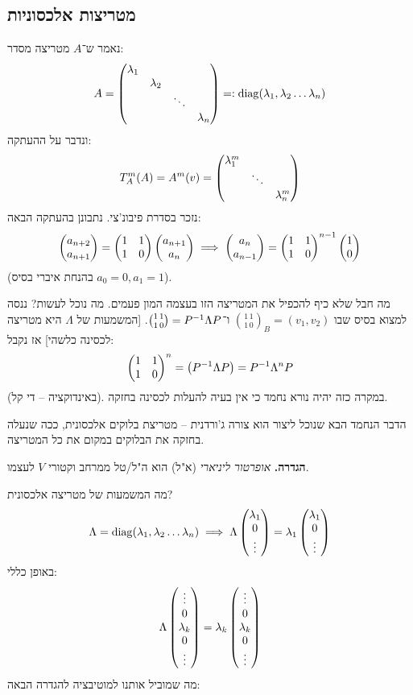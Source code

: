 \documentclass[]{../../../../tex/classes/styledArticle}
\begin{document}
	\subsection{מטריצות אלכסוניות}
	נאמר ש־$A$ מטריצה מסדר: 
	\[ A = \begin{pmatrix} \lambda_1 & & &\\ &\lambda_2 && \\ &&\ddots & \\ &&&\lambda_n \end{pmatrix} =: \operatorname{diag}(\lambda_1, \lambda_2 \dots \lambda_n) \]
	ונדבר על ההעתקה: 
	\[ T_A^m(A) = A^m(v) = \begin{pmatrix} \lambda_1^m && \\ & \ddots & \\ &&\lambda_n^m \end{pmatrix} \]
	נזכר בסדרת פיבונ'צי. נתבונן בהעתקה הבאה: 
	\[ \begin{pmatrix} a_{n + 2} \\ a_{n + 1} \end{pmatrix} = \begin{pmatrix} 1 & 1 \\ 1 & 0 \end{pmatrix}\begin{pmatrix} a_{n + 1} \\ a_n \end{pmatrix} \implies \begin{pmatrix} a_n \\ a_{n - 1} \end{pmatrix} = \begin{pmatrix} 1 & 1 \\ 1 & 0 \end{pmatrix}^{n - 1}\begin{pmatrix} 1 \\ 0 \end{pmatrix} \]
	(בהנחת איברי בסיס $a_0 = 0, a_1 = 1$). 
	
	מה חבל שלא כיף להכפיל את המטריצה הזו בעצמה המון פעמים. מה נוכל לעשות? ננסה למצוא בסיס שבו $\binom{1 \, 1}{1\, 0}_B = (v_1, v_2)$ ו־$\binom{1 \, 1}{1 \, 0} = P^{-1} \Lambda P$. [המשמעות של $\Lambda$ היא מטריצה לכסינה כלשהי] אז נקבל: 
	\[ \begin{pmatrix} 1 & 1 \\ 1 & 0 \end{pmatrix}^{n} = \left ( P^{-1} \Lambda P \right ) = P^{-1}\Lambda^nP \]
	(באינדוקציה – די קל). במקרה כזה יהיה נורא נחמד כי אין בעיה להעלות לכסינה בחזקה. 
	
	הדבר הנחמד הבא שנוכל ליצור הוא צורה ג'ורדנית – מטריצת בלוקים אלכסונית, ככה שנעלה בחזקה את הבלוקים במקום את כל המטריצה. 
	
	\textbf{הגדרה. }\textit{אופרטור ליניארי} (א"ל) הוא ה"ל/טל ממרחב וקטורי $V$ לעצמו. 
	
	מה המשמעות של מטריצה אלכסונית? 
	\[ \Lambda = \operatorname{diag}(\lambda_1, \lambda_2 \dots \lambda_n) \implies \Lambda \begin{pmatrix} \lambda_1 \\ 0 \\ \vdots \end{pmatrix} = \lambda_1 \begin{pmatrix} \lambda_1 \\ 0 \\ \vdots \end{pmatrix} \]
	באופן כללי: 
	\[ \Lambda \begin{pmatrix} \vdots \\ 0 \\ \lambda_k \\ 0 \\ \vdots \end{pmatrix} = \lambda_k \begin{pmatrix} \vdots \\ 0 \\ \lambda_k \\ 0 \\ \vdots \end{pmatrix} \]
	מה שמוביל אותנו למוטיבציה להגדרה הבאה: 
	
\end{document}
